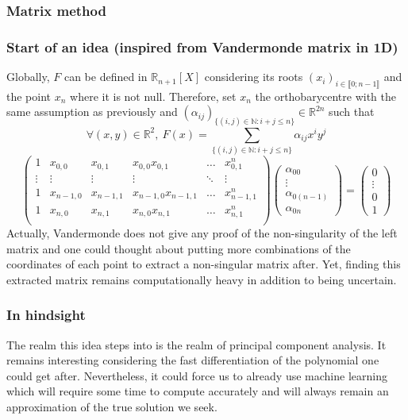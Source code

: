 \documentclass{article}
\theoremstyle{definition}
\theoremstyle{property}
\theoremstyle{remark}
\begin{document}
	\subsubsection{Matrix method}
	\subsubsection*{Start of an idea (inspired from Vandermonde matrix in 1D)}
	Globally, $F$ can be defined in $\mathbb{R}_{n+1}[X]$ considering its roots $(x_i)_{i\in \llbracket0;n-1\rrbracket }$ and the point $x_n$ where it is not null. Therefore, set $x_n$ the orthobarycentre with the same assumption as previously 	and $(\alpha_{ij})_{\{(i,j)\in\mathbb{N}:i+j\leq n\}}\in\mathbb{R}^{2n}$ such that
	\begin{equation*}
		\forall (x,y) \in \mathbb{R}^2,~F(x) = \sum_{\{(i,j)\in\mathbb{N}:i+j\leq n\}} \alpha_{ij}x^iy^j
	\end{equation*}
	\begin{equation*}
		\begin{pmatrix}
			1 & x_{0,0} & x_{0,1} & x_{0,0}x_{0,1} & \dots & x_{0,1}^{n} \\
			\vdots & \vdots&\vdots & \vdots& \ddots & \vdots \\
			1 & x_{n-1,0} & x_{n-1,1} & x_{n-1,0}x_{n-1,1} & \dots &x_{n-1,1}^{n} \\
			1 & x_{n,0} & x_{n,1} & x_{n,0}x_{n,1} & \dots & x_{n,1}^{n} \\
		\end{pmatrix}
		\begin{pmatrix}
			\alpha_{00}\\
			\vdots\\
			\alpha_{0(n-1)}\\
			\alpha_{0n}
		\end{pmatrix}
		=
		\begin{pmatrix}
			0\\
			\vdots\\
			0\\
			1
		\end{pmatrix}
	\end{equation*}
	Actually, Vandermonde does not give any proof of the non-singularity of the left matrix and one could thought about putting more combinations of the coordinates of each point to extract a non-singular matrix after.
	Yet, finding this extracted matrix remains computationally heavy in addition to being uncertain.\\
	
	\subsubsection*{In hindsight}
	The realm this idea steps into is the realm of principal component analysis. It remains interesting considering the fast differentiation of the polynomial one could get after. Nevertheless, it could force us to already use machine learning which will require some time to compute accurately and will always remain an approximation of the true solution we seek.
\end{document}
